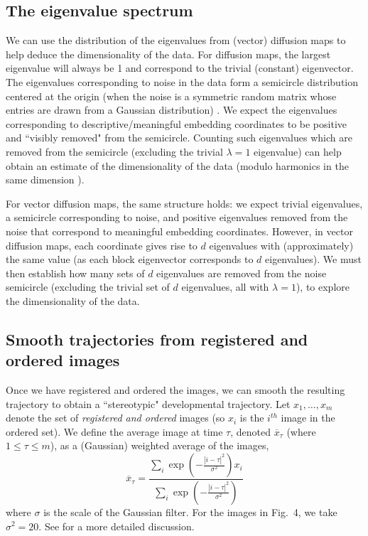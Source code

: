 \documentclass{pnastwo}
\newcommand{\fig}[0]{Fig.}
\begin{document}
\begin{article}
\subsection{The eigenvalue spectrum}

We can use the distribution of the eigenvalues from (vector) diffusion maps to help deduce the dimensionality of the data.
%
For diffusion maps, the largest eigenvalue will always be 1 and correspond to the trivial (constant) eigenvector.
%
The eigenvalues corresponding to noise in the data form a semicircle distribution centered at the origin (when the noise is a symmetric random matrix whose entries are drawn from a Gaussian distribution) \cite{wigner1955characteristic, wigner1958distribution}.
%
We expect the eigenvalues corresponding to descriptive/meaningful embedding coordinates to be positive and ``visibly removed" from the semicircle.
%
Counting such eigenvalues which are removed from the semicircle (excluding the trivial $\lambda=1$ eigenvalue) can help obtain an estimate of the dimensionality of the data (modulo harmonics in the same dimension \cite{ferguson2010systematic}).

For vector diffusion maps, the same structure holds: we expect trivial eigenvalues, a semicircle corresponding to noise, and positive eigenvalues removed from the noise that correspond to meaningful embedding coordinates.
%
However, in vector diffusion maps, each coordinate gives rise to $d$ eigenvalues with (approximately) the same value (as each block eigenvector corresponds to $d$ eigenvalues).
%
We must then establish how many sets of $d$ eigenvalues are removed from the noise semicircle (excluding the trivial set of $d$ eigenvalues, all with  $\lambda=1$), to explore the dimensionality of the data.

\subsection{Smooth trajectories from registered and ordered images}

Once we have registered and ordered the images, we can smooth the resulting trajectory to obtain a ``stereotypic" developmental trajectory.
%
Let $x_1, \dots, x_m$ denote the set of {\em registered and ordered} images (so $x_i$ is the $i^{th}$ image in the ordered set).
%
We define the average image at time $\tau$, denoted $\overline{x}_{\tau}$ (where $1 \le \tau \le m$), as a (Gaussian) weighted average of the images,
\begin{equation}
\overline{x}_{\tau} =  \frac{\sum_i \exp \left( - \frac{|i - \tau|^2}{\sigma^2} \right) x_i}{\sum_i \exp \left( - \frac{|i - \tau|^2}{\sigma^2} \right) }
\end{equation}
where $\sigma$ is the scale of the Gaussian filter.
%
For the images in \fig~4, we take $\sigma^2 = 20$.
%
See \cite{kemelmacher2011exploring} for a more detailed discussion.



\end{article}
\end{document}
